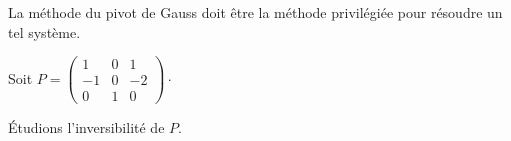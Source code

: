 \documentclass[a4paper,10pt]{report}
\begin{document}
\begin{rem} La méthode du pivot de Gauss doit être la méthode privilégiée pour résoudre un tel système. 
\end{rem}

\begin{ex} Soit $P = \begin{pmatrix}
        1&0&1\\-1&0&-2\\0&1&0
       \end{pmatrix} \cdot$
       
\noindent Étudions l'inversibilité de $P$. 

%

\end{ex}
\end{document}
